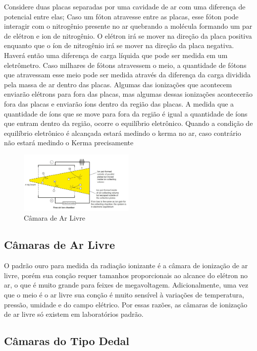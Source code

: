 \documentclass[11pt,a4paper]{article}
\begin{document}
		Considere duas placas separadas por uma cavidade de ar com uma diferença de potencial entre elas; Caso um fóton atravesse entre as placas, esse fóton pode interagir com o nitrogênio presente no ar quebrando a molécula formando um par de elétron e ion de nitrogênio. O elétron irá se mover na direção da placa positiva enquanto que o íon de nitrogênio irá se mover na direção da placa negativa. Haverá então uma diferença de carga líquida que pode ser medida em um eletrômetro. Caso milhares de fótons atravessem o meio, a quantidade de fótons que atravessam esse meio pode ser medida através da diferença da carga dividida pela massa de ar dentro das placas. Algumas das ionizações que acontecem enviarão elétrons para fora das placas, mas algumas dessas ionizações acontecerão fora das placas e enviarão íons dentro da região das placas. A medida que a quantidade de íons que se move para fora da região é igual a quantidade de íons que entram dentro da região, ocorre o equilíbrio eletrônico. Quando a condição de equilíbrio eletrônico é alcançada estará medindo o kerma no ar, caso contrário não estará medindo o Kerma precisamente

		\begin{figure}[h]
			\centering
			\includegraphics[width=0.5\textwidth]{Imagens/camaraArLivre.jpg}
			\caption{Câmara de Ar Livre}
			\label{fig:camaraArLivre}
		\end{figure}

	\subsection{Câmaras de Ar Livre}
		
		O padrão ouro para medida da radiação ionizante é a câmara de ionização de ar livre, porém sua conção requer tamanhos proporcionais ao alcance do elétron no ar, o que é muito grande para feixes de megavoltagem. Adicionalmente, uma vez que o meio é o ar livre sua conção é muito sensível à variações de temperatura, pressão, umidade e do campo elétrico. Por essas razões, as câmaras de ionização de ar livre só existem em laboratórios padrão. 

	\subsection{Câmaras do Tipo Dedal}
\end{document}
